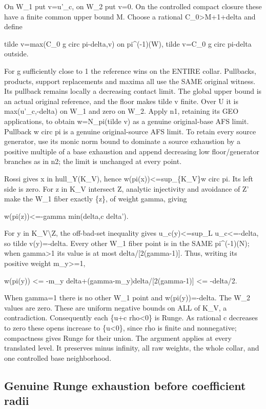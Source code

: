 \documentclass[
  10pt,
]{article}
\begin{document}
On W\_1 put v=u'\_c, on W\_2 put v=0. On the controlled compact closure
these have a finite common upper bound M. Choose a rational
C\_0\textgreater M+1+delta and define

tilde v=max(C\_0 g circ pi-delta,v) on pi\^{}(-1)(W), tilde v=C\_0 g
circ pi-delta outside.

For g sufficiently close to 1 the reference wins on the ENTIRE collar.
Pullbacks, products, support replacements and maxima all use the SAME
original witness. Its pullback remains locally a decreasing contact
limit. The global upper bound is an actual original reference, and the
floor makes tilde v finite. Over U it is max(u'\_c,-delta) on W\_1 and
zero on W\_2. Apply n1, retaining its GEO applications, to obtain
w=N\_pi(tilde v) as a genuine original-base AFS limit. Pullback w circ
pi is a genuine original-source AFS limit. To retain every source
generator, use its monic norm bound to dominate a source exhaustion by a
positive multiple of a base exhaustion and append decreasing low
floor/generator branches as in n2; the limit is unchanged at every
point.

Rossi gives x in hull\_Y(K\_V), hence w(pi(x))\textless=sup\_\{K\_V\}w
circ pi. Its left side is zero. For z in K\_V intersect Z, analytic
injectivity and avoidance of Z' make the W\_1 fiber exactly \{z\}, of
weight gamma, giving

w(pi(z))\textless=-gamma min(delta,c delta').

For y in K\_V\textbackslash Z, the off-bad-set inequality gives
u\_c(y)\textless=sup\_L u\_c\textless=-delta, so tilde v(y)=-delta.
Every other W\_1 fiber point is in the SAME pi\^{}(-1)(N); when
gamma\textgreater1 its value is at most delta/{[}2(gamma-1){]}. Thus,
writing its positive weight m\_y\textgreater=1,

w(pi(y)) \textless= -m\_y delta+(gamma-m\_y)delta/{[}2(gamma-1){]}
\textless= -delta/2.

When gamma=1 there is no other W\_1 point and w(pi(y))=-delta. The W\_2
values are zero. These are uniform negative bounds on ALL of K\_V, a
contradiction. Consequently each \{u+c rho\textless0\} is Runge. As
rational c decreases to zero these opens increase to \{u\textless0\},
since rho is finite and nonnegative; compactness gives Runge for their
union. The argument applies at every translated level. It preserves
minus infinity, all raw weights, the whole collar, and one controlled
base neighborhood.

\subsection{Genuine Runge exhaustion before coefficient
radii}\label{genuine-runge-exhaustion-before-coefficient-radii}
\end{document}
